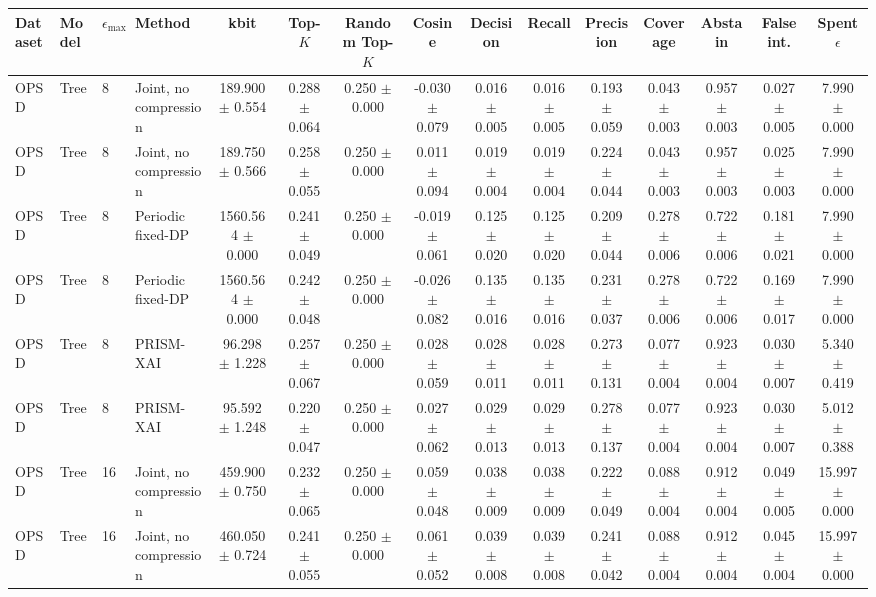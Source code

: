 \begin{tabular}{llllccccccccccc}
\toprule
Dataset & Model & $\epsilon_{\max}$ & Method & kbit & Top-$K$ & Random Top-$K$ & Cosine & Decision & Recall & Precision & Coverage & Abstain & False int. & Spent $\epsilon$ \\
\midrule
OPSD & Tree & 8 & Joint, no compression & 189.900 $\pm$ 0.554 & 0.288 $\pm$ 0.064 & 0.250 $\pm$ 0.000 & -0.030 $\pm$ 0.079 & 0.016 $\pm$ 0.005 & 0.016 $\pm$ 0.005 & 0.193 $\pm$ 0.059 & 0.043 $\pm$ 0.003 & 0.957 $\pm$ 0.003 & 0.027 $\pm$ 0.005 & 7.990 $\pm$ 0.000 \\
OPSD & Tree & 8 & Joint, no compression & 189.750 $\pm$ 0.566 & 0.258 $\pm$ 0.055 & 0.250 $\pm$ 0.000 & 0.011 $\pm$ 0.094 & 0.019 $\pm$ 0.004 & 0.019 $\pm$ 0.004 & 0.224 $\pm$ 0.044 & 0.043 $\pm$ 0.003 & 0.957 $\pm$ 0.003 & 0.025 $\pm$ 0.003 & 7.990 $\pm$ 0.000 \\
OPSD & Tree & 8 & Periodic fixed-DP & 1560.564 $\pm$ 0.000 & 0.241 $\pm$ 0.049 & 0.250 $\pm$ 0.000 & -0.019 $\pm$ 0.061 & 0.125 $\pm$ 0.020 & 0.125 $\pm$ 0.020 & 0.209 $\pm$ 0.044 & 0.278 $\pm$ 0.006 & 0.722 $\pm$ 0.006 & 0.181 $\pm$ 0.021 & 7.990 $\pm$ 0.000 \\
OPSD & Tree & 8 & Periodic fixed-DP & 1560.564 $\pm$ 0.000 & 0.242 $\pm$ 0.048 & 0.250 $\pm$ 0.000 & -0.026 $\pm$ 0.082 & 0.135 $\pm$ 0.016 & 0.135 $\pm$ 0.016 & 0.231 $\pm$ 0.037 & 0.278 $\pm$ 0.006 & 0.722 $\pm$ 0.006 & 0.169 $\pm$ 0.017 & 7.990 $\pm$ 0.000 \\
OPSD & Tree & 8 & PRISM-XAI & 96.298 $\pm$ 1.228 & 0.257 $\pm$ 0.067 & 0.250 $\pm$ 0.000 & 0.028 $\pm$ 0.059 & 0.028 $\pm$ 0.011 & 0.028 $\pm$ 0.011 & 0.273 $\pm$ 0.131 & 0.077 $\pm$ 0.004 & 0.923 $\pm$ 0.004 & 0.030 $\pm$ 0.007 & 5.340 $\pm$ 0.419 \\
OPSD & Tree & 8 & PRISM-XAI & 95.592 $\pm$ 1.248 & 0.220 $\pm$ 0.047 & 0.250 $\pm$ 0.000 & 0.027 $\pm$ 0.062 & 0.029 $\pm$ 0.013 & 0.029 $\pm$ 0.013 & 0.278 $\pm$ 0.137 & 0.077 $\pm$ 0.004 & 0.923 $\pm$ 0.004 & 0.030 $\pm$ 0.007 & 5.012 $\pm$ 0.388 \\
OPSD & Tree & 16 & Joint, no compression & 459.900 $\pm$ 0.750 & 0.232 $\pm$ 0.065 & 0.250 $\pm$ 0.000 & 0.059 $\pm$ 0.048 & 0.038 $\pm$ 0.009 & 0.038 $\pm$ 0.009 & 0.222 $\pm$ 0.049 & 0.088 $\pm$ 0.004 & 0.912 $\pm$ 0.004 & 0.049 $\pm$ 0.005 & 15.997 $\pm$ 0.000 \\
OPSD & Tree & 16 & Joint, no compression & 460.050 $\pm$ 0.724 & 0.241 $\pm$ 0.055 & 0.250 $\pm$ 0.000 & 0.061 $\pm$ 0.052 & 0.039 $\pm$ 0.008 & 0.039 $\pm$ 0.008 & 0.241 $\pm$ 0.042 & 0.088 $\pm$ 0.004 & 0.912 $\pm$ 0.004 & 0.045 $\pm$ 0.004 & 15.997 $\pm$ 0.000 \\

\end{tabular}
